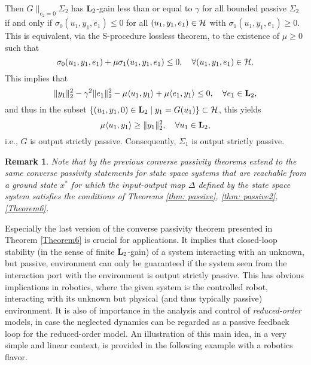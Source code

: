 \documentclass[11pt]{article}
\newtheorem{remark}[lemma]{Remark}
\newcommand{\Ltwo}{\boldsymbol{\rm L}_{2}}
\begin{document}
Then $G \|_{e_2=0} \Sigma_2$ has $\Ltwo$-gain less than or equal to $\gamma$ for all bounded  passive $\Sigma_2$ if and only if
$\sigma_0(u_1, y_1, e_1) \leq 0$ for all  $(u_1, y_1, e_1) \in \mathcal{H}$  with $\sigma_1(u_1, y_1, e_1) \geq 0$.
This is equivalent, via the S-procedure lossless theorem, to the existence of $\mu \geq 0$ such that
\[
 \sigma_0(u_1, y_1, e_1) + \mu \sigma_1(u_1, y_1, e_1) \leq 0, \quad \forall (u_1, y_1, e_1) \in \mathcal{H}.
\]
This implies that
\[
\| y_1 \|_2^2 - \gamma^2  \|e_1\|_2^2  - \mu \langle u_1, y_1 \rangle+  \mu \langle e_1, y_1 \rangle\leq 0, \quad \forall e_1 \in \Ltwo ,
\]
and thus in the subset $\{(u_1, y_1, 0) \in \Ltwo \mid y_1 = G (u_1) \} \subset \HH$, this yields
\[
\mu \langle u_1, y_1 \rangle \geq  \| y_1 \|_2^2, \quad \forall u_1 \in \Ltwo,
\]
i.e., $G$ is output strictly passive. Consequently, $\Sigma_1$ is output strictly passive.

\begin{remark}
Note that by \cite[Prop. 3.1.14]{Sch17} the previous converse passivity theorems extend to the same converse passivity statements for {\it state space systems} that are {\it reachable} from a ground state $x^*$ for which the input-output map $\Delta$ defined by the state space system satisfies the conditions of Theorems \ref{thm: passive}, \ref{thm: passive2}, \ref{Theorem6}.
\end{remark}

Especially the last version of the converse passivity theorem presented in Theorem \ref{Theorem6} is crucial for applications. It implies that closed-loop stability (in the sense of finite $\Ltwo$-gain) of a system
interacting with an unknown, but passive, environment can only be guaranteed if the system seen from the interaction port with the environment is
output strictly passive. This has obvious implications in robotics, where the given system is the controlled robot, interacting with its unknown but physical (and thus typically passive) environment. It is also of importance in the analysis and control of
{\it reduced-order} models, in case the neglected dynamics can be regarded as a passive feedback loop for the reduced-order model. An illustration of this main idea, in a very simple and linear context, is provided in the following example with a robotics flavor.
\end{document}
